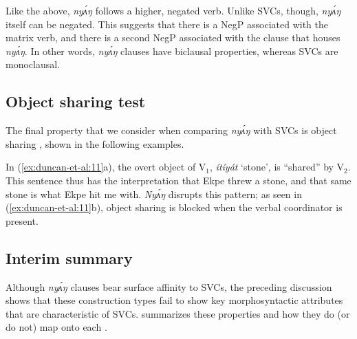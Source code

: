 \documentclass[output=paper,modfonts,nonflat,
hidelinks
]{langsci/langscibook}
\begin{document}
\noindent Like the  above, \textit{ny\'{ʌ}ŋ} follows a higher, negated verb. Unlike SVCs, though, \textit{ny\'{ʌ}ŋ} itself can be negated. This suggests that there is a NegP associated with the matrix verb, and there is a second NegP associated with the clause that houses \textit{ny\'{ʌ}ŋ}. In other words, \textit{ny\'{ʌ}ŋ} clauses have biclausal properties, whereas SVCs are monoclausal.

\subsection{Object sharing test}\label{sec:duncan-et-al:2.4}

The final property that we consider when comparing \textit{ny\'{ʌ}ŋ} with SVCs is object sharing \citep{baker1989object}, shown in the following examples.

\ea\label{ex:duncan-et-al:11}
\z
\z

\noindent In (\ref{ex:duncan-et-al:11}a), the overt object of V$_1$, \textit{ítíyát} `stone', is ``shared'' by V$_2$. This sentence thus has the interpretation that Ekpe threw a stone, and that same stone is what Ekpe hit me with. \textit{Ny\'{ʌ}ŋ} disrupts this pattern; as seen in (\ref{ex:duncan-et-al:11}b), object sharing is blocked when the verbal coordinator is present.

\subsection{Interim summary}\label{sec:duncan-et-al:2.5}

Although \textit{ny\'{ʌ}ŋ} clauses bear surface affinity to SVCs, the preceding discussion shows that these construction types fail to show key morphosyntactic attributes that are characteristic of SVCs.  summarizes these properties and how they do (or do not) map onto each .
\end{document}
